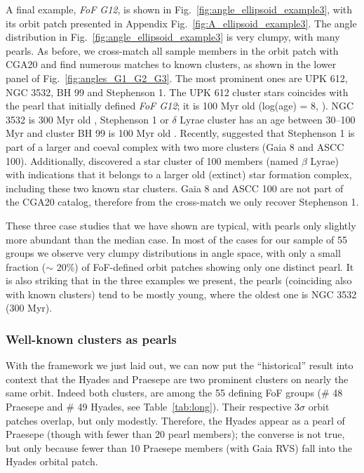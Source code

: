 \documentclass[twocolumn]{aastex631}
\begin{document}
A final example, \textit{FoF G12}, is shown in Fig.~\ref{fig:angle_ellipsoid_example3}, with its orbit patch presented in Appendix Fig.~\ref{fig:A_ellipsoid_example3}. 
The angle distribution in Fig.~\ref{fig:angle_ellipsoid_example3} is very clumpy, with many pearls. As before, we cross-match all sample members in the orbit patch with CGA20 and find numerous matches to known clusters, as shown in the lower panel of Fig.~\ref{fig:angles_G1_G2_G3}. The most prominent ones are UPK 612, NGC 3532, BH 99 and Stephenson 1. The UPK 612 cluster stars coincides with the pearl that initially defined \textit{FoF G12}; it is 100 Myr old (log(age) = 8, \citet{2019JKAS...52..145S}). NGC 3532 is 300 Myr old \citep{2019A&A...622A.110F}, Stephenson 1 or $\delta$ Lyrae cluster has an age between 30--100 Myr \citep{2019A&A...630L...8B} and cluster BH 99 is 100 Myr old \citep{2001A&A...379..136C}. Recently, \citet{2019AJ....158..122K} suggested that Stephenson 1 is part of a larger and coeval complex with two more clusters (Gaia 8 and ASCC 100). Additionally, \citet{2019A&A...630L...8B} discovered a star cluster of 100 members (named $\beta$ Lyrae) with indications that
it belongs to a larger old (extinct) star formation complex, including these two known star clusters. Gaia 8 and ASCC 100 are not part of the CGA20 catalog, therefore from the cross-match we only recover Stephenson 1. 

These three case studies that we have shown are typical, with pearls only slightly more abundant than the median case. In most of the cases for our sample of 55 groups we observe very clumpy distributions in angle space, with only a small fraction ($\sim$ 20\%) of FoF-defined orbit patches showing only one distinct pearl. It is also striking that in the three examples we present, the pearls (coinciding also with known clusters) tend to be mostly young, where the oldest one is NGC 3532 (300 Myr). 

\subsubsection{Well-known clusters as pearls}

With the framework we just laid out, we can now put the ``historical'' result into context that the Hyades and Praesepe are two prominent clusters on nearly the same orbit. Indeed both clusters, are among the 55 defining FoF groups (\# 48 Praesepe and \# 49 Hyades, see Table~\ref{tab:long}). Their respective 3$\sigma$ orbit patches overlap, but only modestly. Therefore, the Hyades appear as a pearl of Praesepe (though with fewer than 20 pearl members); the converse is not true, but only because fewer than 10 Praesepe members (with Gaia RVS) fall into the Hyades orbital patch.
\end{document}
